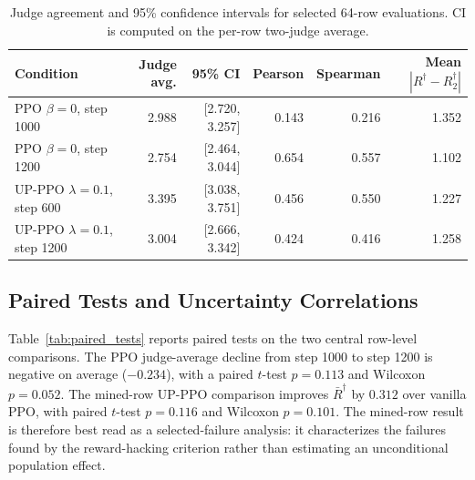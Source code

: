 \documentclass[11pt]{article}
\newcommand{\Rdag}{R^{\dagger}}
\newcommand{\Rtwo}{R^{\dagger}_2}
\begin{document}
\begin{table}[!tbp]
\centering
\scriptsize
\caption{Judge agreement and 95\% confidence intervals for selected 64-row evaluations. CI is computed on the per-row two-judge average.}
\label{tab:judge_agreement}
\begin{tabular}{lrrrrr}
\toprule
Condition & Judge avg. & 95\% CI & Pearson & Spearman & Mean $|\Rdag-\Rtwo|$ \\
\midrule
PPO $\beta=0$, step 1000 & 2.988 & [2.720, 3.257] & 0.143 & 0.216 & 1.352 \\
PPO $\beta=0$, step 1200 & 2.754 & [2.464, 3.044] & 0.654 & 0.557 & 1.102 \\
UP-PPO $\lambda=0.1$, step 600 & 3.395 & [3.038, 3.751] & 0.456 & 0.550 & 1.227 \\
UP-PPO $\lambda=0.1$, step 1200 & 3.004 & [2.666, 3.342] & 0.424 & 0.416 & 1.258 \\
\bottomrule
\end{tabular}
\end{table}


\subsection{Paired Tests and Uncertainty Correlations}
Table~\ref{tab:paired_tests} reports paired tests on the two central row-level comparisons. The PPO judge-average decline from step 1000 to step 1200 is negative on average ($-0.234$), with a paired $t$-test $p=0.113$ and Wilcoxon $p=0.052$. The mined-row UP-PPO comparison improves $\bar R^\dagger$ by $0.312$ over vanilla PPO, with paired $t$-test $p=0.116$ and Wilcoxon $p=0.101$. The mined-row result is therefore best read as a selected-failure analysis: it characterizes the failures found by the reward-hacking criterion rather than estimating an unconditional population effect.

\begin{table}[!tbp]
\centering
\scriptsize
\caption{Paired tests for checkpoint-level judge degradation and mined-row mitigation. Deltas are after minus before.}
\label{tab:paired_tests}
\end{table}
\end{document}
